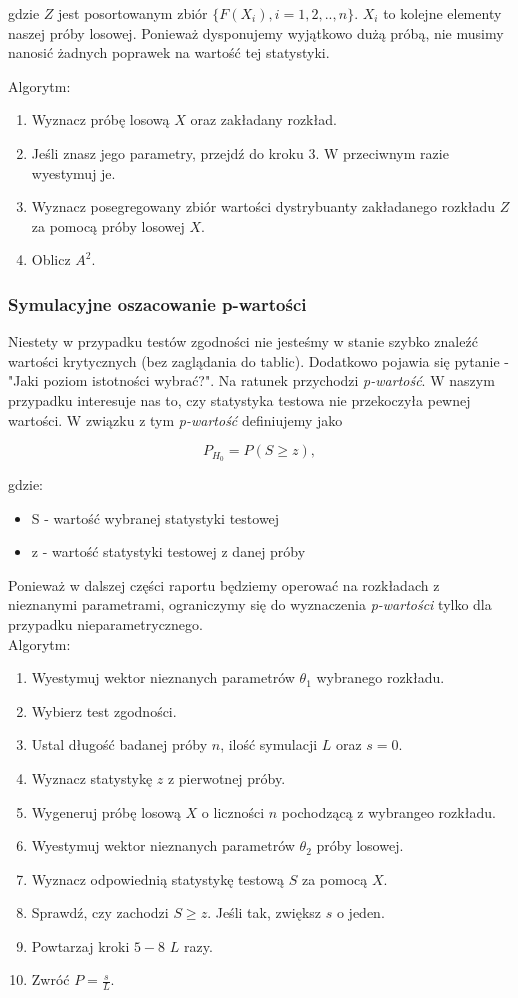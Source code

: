 \documentclass{article}
\theoremstyle{break}
\numberwithin{equation}{subsection}
\numberwithin{figure}{section}
\begin{document}
gdzie $Z$ jest posortowanym zbiór $\{F(X_i), i=1,2,..,n\}$. $X_i$ to kolejne elementy naszej próby losowej.
Ponieważ dysponujemy wyjątkowo dużą próbą, nie musimy nanosić żadnych poprawek na wartość tej statystyki.

Algorytm:

\begin{enumerate}
\item Wyznacz próbę losową $X$ oraz zakładany rozkład.
\item Jeśli znasz jego parametry, przejdź do kroku 3. W przeciwnym razie wyestymuj je.
\item Wyznacz posegregowany zbiór wartości dystrybuanty zakładanego rozkładu $Z$ za pomocą próby losowej $X$.
\item Oblicz $A^2$.
\end{enumerate}

\subsubsection{Symulacyjne oszacowanie p-wartości}

Niestety w przypadku testów zgodności nie jesteśmy w stanie szybko znaleźć wartości krytycznych (bez zaglądania do tablic). Dodatkowo pojawia się pytanie - "Jaki poziom istotności wybrać?". Na ratunek przychodzi \emph{p-wartość}. W naszym przypadku interesuje nas to, czy statystyka testowa nie przekoczyła pewnej wartości.
W związku z tym \emph{p-wartość} definiujemy jako 

$$P_{H_0} = P(S \ge z),$$

gdzie:

\begin{itemize}
\item S - wartość wybranej statystyki testowej
\item z - wartość statystyki testowej z danej próby
\end{itemize}

Ponieważ w dalszej części raportu będziemy operować na rozkładach z nieznanymi parametrami, ograniczymy się do wyznaczenia \emph{p-wartości} tylko dla przypadku nieparametrycznego.
\\
Algorytm:
\begin{enumerate}
\item Wyestymuj wektor nieznanych parametrów $\theta_1$ wybranego rozkładu.
\item Wybierz test zgodności.
\item Ustal długość badanej próby $n$, ilość symulacji $L$ oraz $s = 0$.
\item Wyznacz statystykę $z$ z pierwotnej próby.
\item Wygeneruj próbę losową $X$ o liczności $n$ pochodzącą z wybrangeo rozkładu.
\item Wyestymuj wektor nieznanych parametrów  $\theta_2$ próby losowej.
\item Wyznacz odpowiednią statystykę testową $S$ za pomocą $X$.
\item Sprawdź, czy zachodzi $S \ge z$. Jeśli tak, zwiększ $s$ o jeden.
\item Powtarzaj kroki $5-8$ $L$ razy.
\item Zwróć $P = \frac{s}{L}$.
\end{enumerate}
\end{document}
